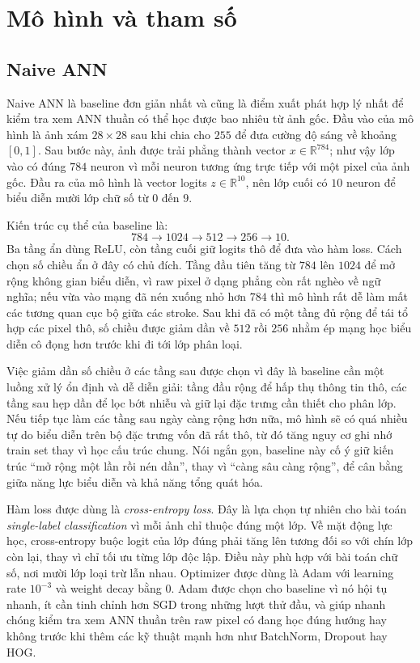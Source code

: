 

\section{Mô hình và tham số}
\subsection{Naive ANN}

Naive ANN là baseline đơn giản nhất và cũng là điểm xuất phát hợp lý nhất để kiểm tra xem ANN thuần có thể học được bao nhiêu từ ảnh gốc. Đầu vào của mô hình là ảnh xám $28 \times 28$ sau khi chia cho $255$ để đưa cường độ sáng về khoảng $[0,1]$. Sau bước này, ảnh được trải phẳng thành vector $x \in \mathbb{R}^{784}$; như vậy lớp vào có đúng $784$ neuron vì mỗi neuron tương ứng trực tiếp với một pixel của ảnh gốc. Đầu ra của mô hình là vector logits $z \in \mathbb{R}^{10}$, nên lớp cuối có $10$ neuron để biểu diễn mười lớp chữ số từ $0$ đến $9$.

Kiến trúc cụ thể của baseline là:
\[
784 \rightarrow 1024 \rightarrow 512 \rightarrow 256 \rightarrow 10.
\]
Ba tầng ẩn dùng ReLU, còn tầng cuối giữ logits thô để đưa vào hàm loss. Cách chọn số chiều ẩn ở đây có chủ đích. Tầng đầu tiên tăng từ $784$ lên $1024$ để mở rộng không gian biểu diễn, vì raw pixel ở dạng phẳng còn rất nghèo về ngữ nghĩa; nếu vừa vào mạng đã nén xuống nhỏ hơn $784$ thì mô hình rất dễ làm mất các tương quan cục bộ giữa các stroke. Sau khi đã có một tầng đủ rộng để tái tổ hợp các pixel thô, số chiều được giảm dần về $512$ rồi $256$ nhằm ép mạng học biểu diễn cô đọng hơn trước khi đi tới lớp phân loại.

Việc giảm dần số chiều ở các tầng sau được chọn vì đây là baseline cần một luồng xử lý ổn định và dễ diễn giải: tầng đầu rộng để hấp thụ thông tin thô, các tầng sau hẹp dần để lọc bớt nhiễu và giữ lại đặc trưng cần thiết cho phân lớp. Nếu tiếp tục làm các tầng sau ngày càng rộng hơn nữa, mô hình sẽ có quá nhiều tự do biểu diễn trên bộ đặc trưng vốn đã rất thô, từ đó tăng nguy cơ ghi nhớ train set thay vì học cấu trúc chung. Nói ngắn gọn, baseline này cố ý giữ kiến trúc ``mở rộng một lần rồi nén dần'', thay vì ``càng sâu càng rộng'', để cân bằng giữa năng lực biểu diễn và khả năng tổng quát hóa.

Hàm loss được dùng là \textit{cross-entropy loss}. Đây là lựa chọn tự nhiên cho bài toán \textit{single-label classification} vì mỗi ảnh chỉ thuộc đúng một lớp. Về mặt động lực học, cross-entropy buộc logit của lớp đúng phải tăng lên tương đối so với chín lớp còn lại, thay vì chỉ tối ưu từng lớp độc lập. Điều này phù hợp với bài toán chữ số, nơi mười lớp loại trừ lẫn nhau. Optimizer được dùng là Adam với learning rate $10^{-3}$ và weight decay bằng $0$. Adam được chọn cho baseline vì nó hội tụ nhanh, ít cần tinh chỉnh hơn SGD trong những lượt thử đầu, và giúp nhanh chóng kiểm tra xem ANN thuần trên raw pixel có đang học đúng hướng hay không trước khi thêm các kỹ thuật mạnh hơn như BatchNorm, Dropout hay HOG.

